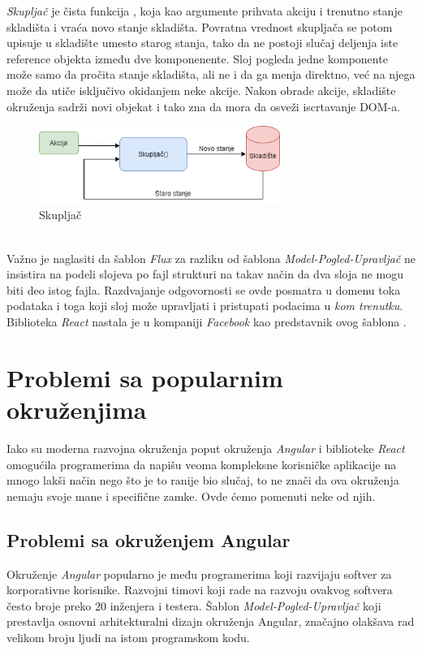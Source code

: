 \documentclass[12pt,oneside]{memoir}
\begin{document}
\emph{Skupljač} je čista funkcija \cite{functionalProgramming}, koja kao argumente
prihvata akciju i trenutno stanje skladišta i vraća novo stanje skladišta.
Povratna vrednost skupljača se potom upisuje u skladište umesto starog stanja, tako da ne postoji slučaj deljenja iste reference objekta
između dve komponenente. Sloj pogleda jedne komponente može samo da pročita stanje skladišta, ali ne i da ga menja direktno, već na njega može da utiče
isključivo okidanjem neke akcije. Nakon obrade akcije, skladište okruženja sadrži novi objekat i tako zna da mora da osveži iscrtavanje DOM-a.
\begin{figure}[!ht]
  \centering
  \includegraphics[width=0.7\textwidth]{slike/Reducer.png}
  \caption{Skupljač}
  \label{fig:reducer}
\end{figure}
\\
Važno je naglasiti da šablon \emph{Flux} za razliku od šablona \emph{Model-Pogled-Upravljač} ne insistira
na podeli slojeva po fajl strukturi na takav način da dva sloja ne mogu biti deo istog fajla.
Razdvajanje odgovornosti se ovde posmatra u domenu toka podataka i toga koji sloj može
upravljati i pristupati podacima u \emph{kom trenutku}. Biblioteka \emph{React} nastala je u kompaniji \emph{Facebook} kao predstavnik ovog šablona \cite{React}.
\chapter{Problemi sa popularnim okruženjima}\label{chap:problemi}
Iako su moderna razvojna okruženja poput okruženja \emph{Angular} i biblioteke \emph{React} omogućila
programerima da napišu veoma kompleksne korisničke aplikacije na mnogo lakši način nego što je to ranije bio slučaj,
to ne znači da ova okruženja nemaju svoje mane i specifične zamke. Ovde ćemo pomenuti neke od njih.
\section{Problemi sa okruženjem Angular}
Okruženje \emph{Angular} popularno je među programerima koji razvijaju softver za korporativne korisnike.
Razvojni timovi koji rade na razvoju ovakvog softvera često broje preko 20 inženjera i testera.
Šablon \emph{Model-Pogled-Upravljač} koji prestavlja osnovni arhitekturalni dizajn okruženja Angular,
značajno olakšava rad velikom broju ljudi na istom programskom kodu.
\end{document}
